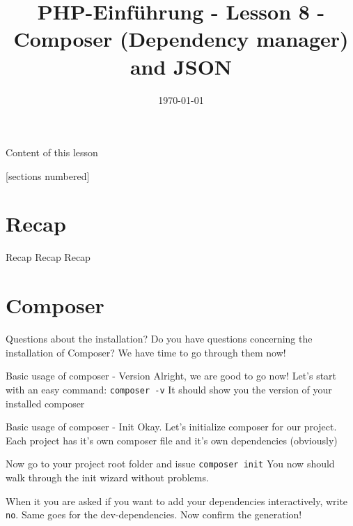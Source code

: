 


\newcommand{\topic}{
	PHP-Einführung - Lesson 8 - Composer (Dependency manager) and JSON
}

\title{\topic}
\date{\today}



\maketitle

\begin{frame}{Content of this lesson}

	[sections numbered]
	\tableofcontents

\end{frame}

\section{Recap}

\begin{frame}{Recap Recap Recap}
\end{frame}

\section{Composer}

\begin{frame}{Questions about the installation?}
	Do you have questions concerning the installation of Composer? We have time to go through them now!
\end{frame}

\begin{frame}{Basic usage of composer - Version}
	Alright, we are good to go now! \pause
	Let's start with an easy command: \texttt{composer -v} \pause
	It should show you the version of your installed composer
\end{frame}

\begin{frame}{Basic usage of composer - Init}
	Okay. Let's initialize composer for our project. 
	Each project has it's own composer file and it's own dependencies (obviously) \pause
	
	
	Now go to your project root folder and issue \texttt{composer init} \pause
	You now should walk through the init wizard without problems.
	
	When it you are asked if you want to add your dependencies interactively, write \texttt{no}. Same goes for the dev-dependencies. Now confirm the generation!

\end{frame}

